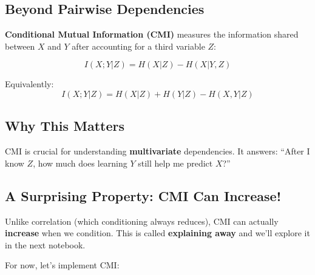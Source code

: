 \documentclass[
  11pt,
  letterpaper,
  oneside,
  openany]{book}
\begin{document}
\subsection{Beyond Pairwise
Dependencies}\label{beyond-pairwise-dependencies}

\textbf{Conditional Mutual Information (CMI)} measures the information
shared between \(X\) and \(Y\) after accounting for a third variable
\(Z\):

\[I(X;Y|Z) = H(X|Z) - H(X|Y,Z)\]

Equivalently: \[I(X;Y|Z) = H(X|Z) + H(Y|Z) - H(X,Y|Z)\]

\subsection{Why This Matters}\label{why-this-matters}

CMI is crucial for understanding \textbf{multivariate} dependencies. It
answers: ``After I know \(Z\), how much does learning \(Y\) still help
me predict \(X\)?''

\subsection{A Surprising Property: CMI Can
Increase!}\label{a-surprising-property-cmi-can-increase}

Unlike correlation (which conditioning always reduces), CMI can actually
\textbf{increase} when we condition. This is called \textbf{explaining
away} and we'll explore it in the next notebook.

For now, let's implement CMI:
\end{document}
